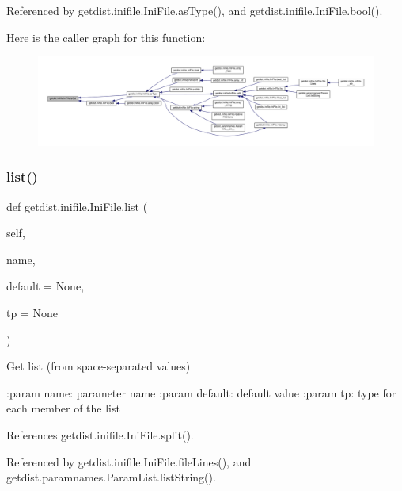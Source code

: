 Referenced by getdist.\+inifile.\+Ini\+File.\+as\+Type(), and getdist.\+inifile.\+Ini\+File.\+bool().

Here is the caller graph for this function\+:
\nopagebreak
\begin{figure}[H]
\begin{center}
\leavevmode
\includegraphics[width=350pt]{classgetdist_1_1inifile_1_1IniFile_a12654a2e6bfd201d99e277bd6e1c6125_icgraph}
\end{center}
\end{figure}
\mbox{\label{classgetdist_1_1inifile_1_1IniFile_ab16c07aad361f648bc04bd646ccabc68}} 
\subsubsection{\texorpdfstring{list()}{list()}}
{\footnotesize\ttfamily def getdist.\+inifile.\+Ini\+File.\+list (\begin{DoxyParamCaption}\item[{}]{self,  }\item[{}]{name,  }\item[{}]{default = {\ttfamily None},  }\item[{}]{tp = {\ttfamily None} }\end{DoxyParamCaption})}

\begin{DoxyVerb}Get list (from space-separated values)

:param name: parameter name
:param default: default value
:param tp: type for each member of the list
\end{DoxyVerb}
 

References getdist.\+inifile.\+Ini\+File.\+split().



Referenced by getdist.\+inifile.\+Ini\+File.\+file\+Lines(), and getdist.\+paramnames.\+Param\+List.\+list\+String().

